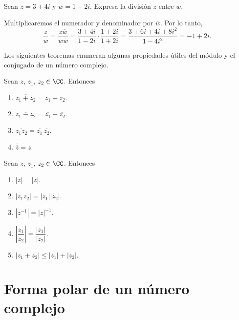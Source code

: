 \begin{examplebox}{}{}
    Sean $z = 3 + 4i$ y $w = 1 - 2i$. Expresa la división $z$ entre $w$.

    \tcblower
    \solucion Multiplicaremos el numerador y denominador por $\overline{w}$. Por lo tanto,
    $$\frac{z}{w} = \frac{z\overline{w}}{w\overline{w}} = \frac{3 + 4i}{1 - 2i} \cdot \frac{1 + 2i}{1 + 2i} = \frac{3 + 6i + 4i + 8i^2}{1 - 4i^2} = -1 + 2i.$$
\end{examplebox}

Los siguientes teoremas enumeran algunas propiedades útiles del módulo y el conjugado de un número complejo.

\begin{theorem}{}{}
    Sean $z$, $z_1$, $z_2 \in \CC$. Entonces
    \begin{enumerate}[label=\roman*), topsep=6pt, itemsep=0pt]
        \item $\overline{z_1 + z_2} = \overline{z_1} + \overline{z_2}$.
        \item $\overline{z_1 - z_2} = \overline{z_1} - \overline{z_2}$.
        \item $\overline{z_1z_2} = \overline{z_1} \, \overline{z_2}$.
        \item $\overline{\overline{z}} = z$.
    \end{enumerate}
\end{theorem}

\newpage

\begin{theorem}{}{}
    Sean $z$, $z_1$, $z_2 \in \CC$. Entonces
    \begin{enumerate}[label=\roman*), topsep=6pt, itemsep=0pt]
        \item $|\overline{z}| = |z|$.
        \item $|z_1 z_2| = |z_1| |z_2|$.
        \item $\left| z^{-1} \right| = |z|^{-1}$.
        \item $\left| \dfrac{z_1}{z_2} \right| = \dfrac{|z_1|}{|z_2|}$.
        \item $|z_1 + z_2| \leq |z_1| + |z_2|$.
    \end{enumerate}
\end{theorem}

\section{Forma polar de un número complejo}

